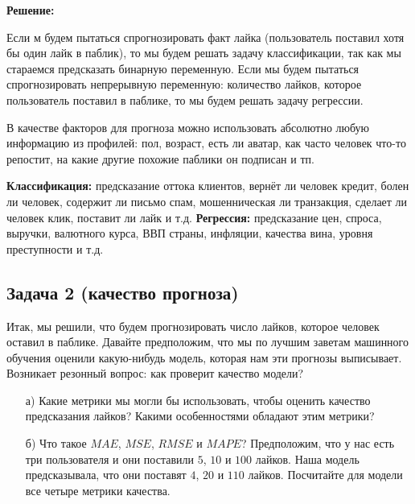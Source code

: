 \documentclass[12pt, a4paper, oneside]{article}
\begin{document}
\textbf{Решение:} 

Если м будем пытаться спрогнозировать факт лайка (пользователь поставил хотя бы один лайк в паблик), то мы будем решать задачу классификации, так как мы стараемся предсказать бинарную переменную. Если мы будем пытаться спрогнозировать непрерывную переменную: количество лайков, которое пользователь поставил в паблике, то мы будем решать задачу регрессии. 

В качестве факторов для прогноза можно использовать абсолютно любую информацию из профилей: пол, возраст, есть ли аватар, как часто человек что-то репостит, на какие другие похожие паблики он подписан и тп. 

\textbf{Классификация:} предсказание оттока клиентов, вернёт ли человек кредит, болен ли человек, содержит ли письмо спам, мошенническая ли транзакция,  сделает ли человек клик,  поставит ли лайк и т.д. \textbf{Регрессия:} предсказание цен, спроса, выручки, валютного курса,  ВВП страны, инфляции, качества вина, уровня преступности и т.д.


\subsection*{Задача 2 (качество прогноза)}

Итак, мы решили, что будем прогнозировать число лайков, которое человек оставил в паблике. Давайте предположим, что мы по лучшим заветам машинного обучения оценили какую-нибудь модель, которая нам эти прогнозы выписывает. Возникает резонный вопрос: как проверит качество модели? 

\begin{enumerate}
	\item[а)]  Какие метрики мы могли бы использовать, чтобы оценить качество предсказания лайков?  Какими особенностями обладают этим метрики? 
	\item[б)]  Что такое $MAE$, $MSE$, $RMSE$ и $MAPE$? Предположим, что у нас есть три пользователя и они поставили $5$, $10$ и $100$ лайков. Наша модель предсказывала, что они поставят $4$, $20$ и $110$ лайков. Посчитайте для модели все четыре метрики качества. 
\end{enumerate}

\end{document}
